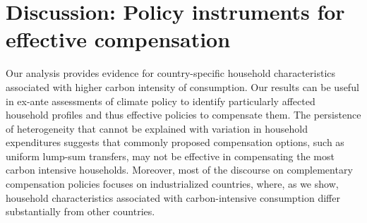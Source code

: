 \documentclass[12pt, a4paper]{article}
\begin{document}

\section{Discussion: Policy instruments for effective compensation} \label{sec:discussion}

Our analysis provides evidence for country-specific household characteristics associated with higher carbon intensity of consumption. Our results can be useful in ex-ante assessments of climate policy to identify particularly affected household profiles and thus effective policies to compensate them. The persistence of heterogeneity that cannot be explained with variation in household expenditures suggests that commonly proposed compensation options, such as uniform lump-sum transfers, may not be effective in compensating the most carbon intensive households. Moreover, most of the discourse on complementary compensation policies focuses on industrialized countries, where, as we show, household characteristics associated with carbon-intensive consumption differ substantially from other countries. 
\end{document}
